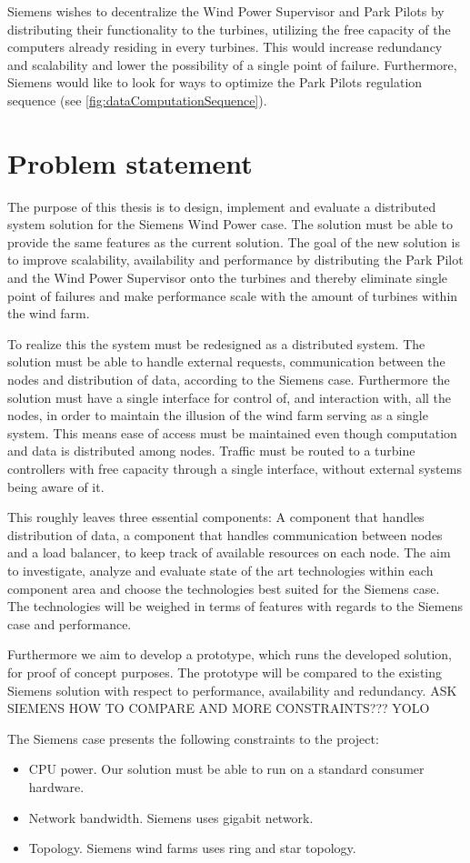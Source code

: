 Siemens wishes to decentralize the Wind Power Supervisor and Park Pilots by distributing their functionality to the turbines, utilizing the free capacity of the computers already residing in every turbines. This would increase redundancy and scalability and lower the possibility of a single point of failure. Furthermore, Siemens would like to look for ways to optimize the Park Pilots regulation sequence (see \cref{fig:dataComputationSequence}).


\section{Problem statement}

The purpose of this thesis is to design, implement and evaluate a distributed system solution for the Siemens Wind Power case. The solution must be able to provide the same features as the current solution. The goal of the new solution is to improve scalability, availability and performance by distributing the Park Pilot and the Wind Power Supervisor onto the turbines and thereby eliminate single point of failures and make performance scale with the amount of turbines within the wind farm. 

To realize this the system must be redesigned as a distributed system. The solution must be able to handle external requests, communication between the nodes and distribution of data, according to the Siemens case. Furthermore the solution must have a single interface for control of, and interaction with, all the nodes, in order to maintain the illusion of the wind farm serving as a single system. This means ease of access must be maintained even though computation and data is distributed among nodes. Traffic must be routed to a turbine controllers with free capacity through a single interface, without external systems being aware of it.

This roughly leaves three essential components: A component that handles distribution of data, a component that handles communication between nodes and a load balancer, to keep track of available resources on each node. The aim to investigate, analyze and evaluate state of the art technologies within each component area and choose the technologies best suited for the Siemens case. The technologies will be weighed in terms of features with regards to the Siemens case and performance.

Furthermore we aim to develop a prototype, which runs the developed solution, for proof of concept purposes. The prototype will be compared to the existing Siemens solution with respect to performance, availability and redundancy. ASK SIEMENS HOW TO COMPARE AND MORE CONSTRAINTS??? YOLO 

The Siemens case presents the following constraints to the project:
\begin{itemize}
	\item CPU power. Our solution must be able to run on a standard consumer hardware.
	\item Network bandwidth. Siemens uses gigabit network.
	\item Topology. Siemens wind farms uses ring and star topology.
\end{itemize}

